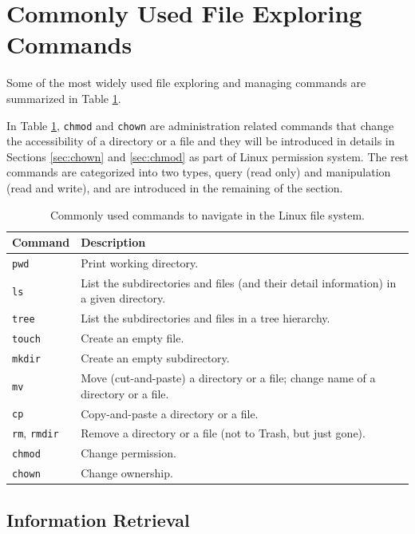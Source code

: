 \section{Commonly Used File Exploring Commands} \label{ch:fm:sec:filemanagement}

Some of the most widely used file exploring and managing commands are summarized in Table \ref{ch:fm:tab:commonfilecommands}. 

In Table \ref{ch:fm:tab:commonfilecommands}, \verb|chmod| and \verb|chown| are administration related commands that change the accessibility of a directory or a file and they will be introduced in details in Sections \ref{sec:chown} and \ref{sec:chmod} as part of Linux permission system. The rest commands are categorized into two types, query (read only) and manipulation (read and write), and are introduced in the remaining of the section.

\begin{table}[!htb]
  \centering \caption{Commonly used commands to navigate in the Linux file system.}\label{ch:fm:tab:commonfilecommands}
  \begin{tabularx}{\textwidth}{lX}
    \hline
    Command & Description \\ \hline
    \verb|pwd| & Print working directory. \\ 
    \verb|ls| & List the subdirectories and files (and their detail information) in a given directory. \\ 
    \verb|tree| & List the subdirectories and files in a tree hierarchy. \\  
    \verb|touch| & Create an empty file. \\ 
    \verb|mkdir| & Create an empty subdirectory. \\ 
    \verb|mv| & Move (cut-and-paste) a directory or a file; change name of a directory or a file. \\ 
    \verb|cp| & Copy-and-paste a directory or a file. \\ 
    \verb|rm|, \verb|rmdir| & Remove a directory or a file (not to Trash, but just gone). \\ 
    \verb|chmod| & Change permission. \\ 
    \verb|chown| & Change ownership. \\
    \hline
  \end{tabularx}
\end{table}

\subsection{Information Retrieval}

